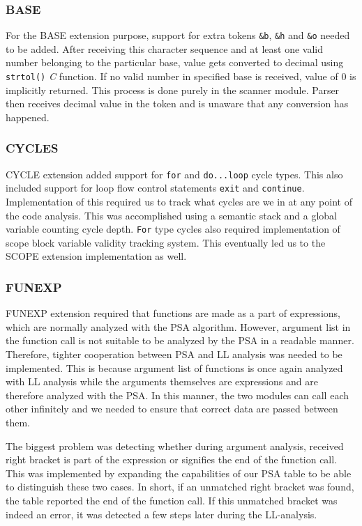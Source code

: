 \documentclass[a4paper, 11pt]{article}
\begin{document}
\subsubsection{BASE}

For the BASE extension purpose, support for extra tokens \texttt{\&b}, \texttt{\&h} and \texttt{\&o} needed to be added. After receiving this character sequence and at least one valid number belonging to the particular base, value gets converted to decimal using \texttt{strtol()} \emph{C} function. If no valid number in specified base is received, value of $0$ is implicitly returned. This process is done purely in the scanner module. Parser then receives decimal value in the token and is unaware that any conversion has happened.

\subsubsection{CYCLES}

CYCLE extension added support for \texttt{for} and \texttt{do...loop} cycle types. This also included support for loop flow control statements \texttt{exit} and \texttt{continue}. Implementation of this required us to track what cycles are we in at any point of the code analysis. This was accomplished using a semantic stack and a global variable counting cycle depth. \texttt{For} type cycles also required implementation of scope block variable validity tracking system. This eventually led us to the SCOPE extension implementation as well.

\subsubsection{FUNEXP}

FUNEXP extension required that functions are made as a part of expressions, which are normally analyzed with the PSA algorithm. However, argument list in the function call is not suitable to be analyzed by the PSA in a readable manner. Therefore, tighter cooperation between PSA and LL analysis was needed to be implemented. This is because argument list of functions is once again analyzed with LL analysis while the arguments themselves are expressions and are therefore analyzed with the PSA. In this manner, the two modules can call each other infinitely and we needed to ensure that correct data are passed between them.

The biggest problem was detecting whether during argument analysis, received right bracket is part of the expression or signifies the end of the function call. This was implemented by expanding the capabilities of our PSA table to be able to distinguish these two cases. In short, if an unmatched right bracket was found, the table reported the end of the function call. If this unmatched bracket was indeed an error, it was detected a few steps later during the LL-analysis.
\end{document}
